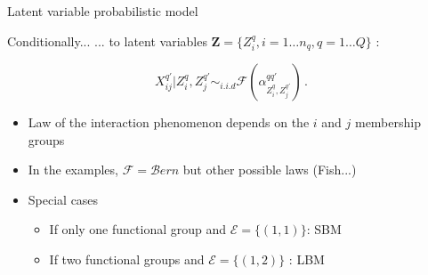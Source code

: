 \documentclass[compress,10pt]{beamer}
\def\Ecal{\mathcal{E}}
\begin{document}
\begin{frame}{Latent variable probabilistic model}


\begin{block}{ 
Conditionally... }
... to latent variables $\boldsymbol{Z}=\{Z^{q}_i, i=1\dots n_q, q=1\dots Q\}$ : 

\begin{equation}\label{eq:mod_new}
X^{q'}_{ij} | Z^{q}_i, Z^{q'}_j \sim_{i.i.d} \mathcal{F}(\alpha^{qq'}_{Z^q_i, Z^{q'}_j})\,.
\end{equation}
\end{block}

\begin{itemize}
\item Law of the interaction phenomenon depends on the $i$ and $j$ membership groups 
\item In the examples, $\mathcal{F} = \mathcal{B}ern$ but other possible laws (Fish...)
\item Special cases
\begin{itemize}
\item If only one functional group and $\Ecal=\{(1,1)\}$: SBM
\item If two functional groups and $\Ecal=\{(1,2)\}$ :  LBM
\end{itemize}
\end{itemize}

\cite{multipartite}
\end{frame}
\end{document}
